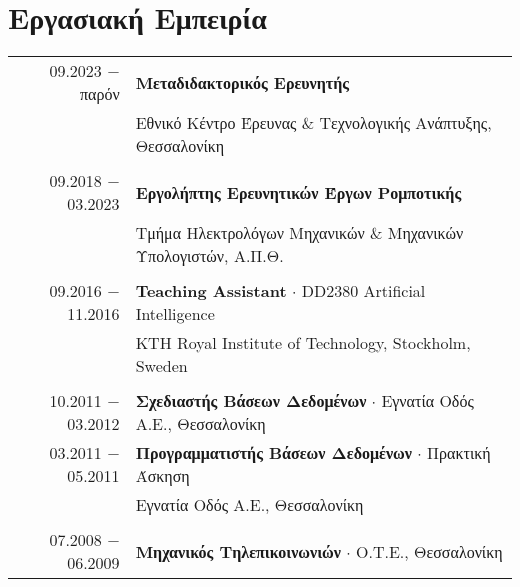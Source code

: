 \documentclass[a4paper,10pt,twoside]{article}
\begin{document}


\par{\bigskip\par}


\section{Εργασιακή Εμπειρία}

\begin{tabular}{rp{12cm}}
09.2023  $-$ \hfill παρόν \hfill  & \textbf{Μεταδιδακτορικός Ερευνητής} \\
                    & Εθνικό Κέντρο Έρευνας \& Τεχνολογικής Ανάπτυξης, Θεσσαλονίκη \\
&\\
09.2018 $-$ 03.2023 & \textbf{Εργολήπτης Ερευνητικών Έργων Ρομποτικής} \\
                    & Τμήμα Ηλεκτρολόγων Μηχανικών \& Μηχανικών Υπολογιστών, Α.Π.Θ.\\
&\\
09.2016 $-$ 11.2016 & \textbf{Teaching Assistant} $\cdot$ DD2380 Artificial Intelligence \\ & KTH Royal Institute of Technology, Stockholm, Sweden\\
&\\
10.2011 $-$ 03.2012 & \textbf{Σχεδιαστής Βάσεων Δεδομένων} $\cdot$ Εγνατία Οδός Α.Ε., Θεσσαλονίκη \\
03.2011 $-$ 05.2011 & \textbf{Προγραμματιστής Βάσεων Δεδομένων} $\cdot$ Πρακτική Άσκηση \\ & Εγνατία Οδός Α.Ε., Θεσσαλονίκη \\
&\\
07.2008 $-$ 06.2009 & \textbf{Μηχανικός Τηλεπικοινωνιών} $\cdot$ Ο.Τ.Ε., Θεσσαλονίκη\\
\end{tabular} \\
\end{document}
